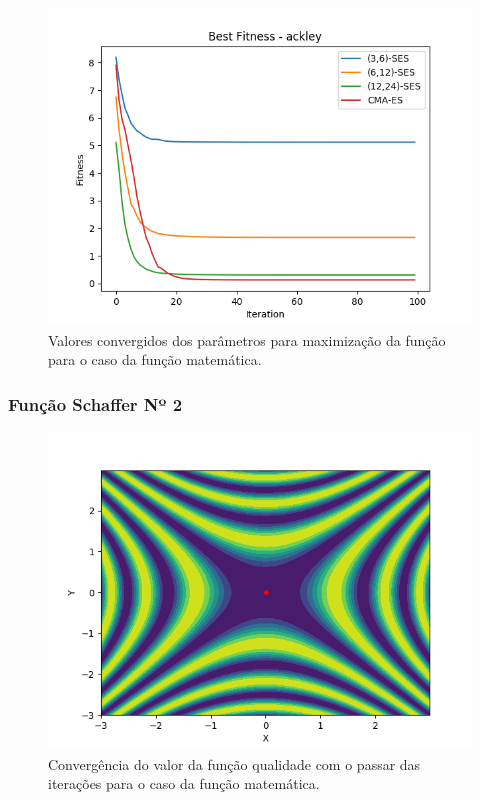 \documentclass[conference]{IEEEtran}
\begin{document}
\begin{figure}[htbp]
\centering
\centerline{\includegraphics[scale=0.4]{imagens/ackley/best_fitness.png}}
\caption{Valores convergidos dos parâmetros para maximização da função para o caso da função matemática.}
\label{ackley/best_fitness}
\end{figure}

\subsubsection{Função Schaffer Nº 2}

\begin{figure}[htbp]
\centering
\centerline{\includegraphics[scale=0.4]{imagens/schaffer2d/ses.png}}
\caption{Convergência do valor da função qualidade com o passar das iterações para o caso da função matemática.}
\label{schaffer2d/ses}
\end{figure} 
\end{document}
